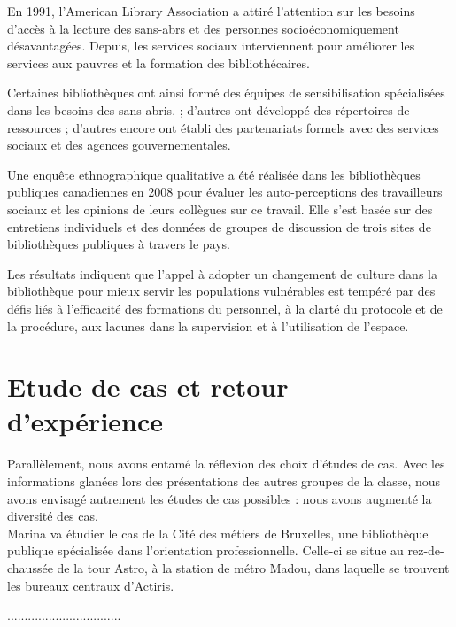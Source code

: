 \documentclass[french,a4paper,12pt]{article}
\begin{document}
\quad En 1991, l’American Library Association a attiré l’attention sur les besoins d’accès à la lecture des sans-abrs et des personnes socioéconomiquement désavantagées. Depuis, les services sociaux interviennent pour améliorer les services aux pauvres et la formation des bibliothécaires.  

Certaines bibliothèques ont ainsi formé des équipes de sensibilisation spécialisées dans les besoins des sans-abris. ; d'autres ont développé des répertoires de ressources ; d'autres encore ont établi des partenariats formels avec des services sociaux et des agences gouvernementales. 
 
Une enquête ethnographique qualitative a été réalisée dans les bibliothèques publiques canadiennes en 2008 pour évaluer les auto-perceptions des travailleurs sociaux et les opinions de leurs collègues sur ce travail. Elle s’est basée sur des entretiens individuels et des données de groupes de discussion de trois sites de bibliothèques publiques à travers le pays. 

Les résultats indiquent que l'appel à adopter un changement de culture dans la bibliothèque pour mieux servir les populations vulnérables est tempéré par des défis liés à l'efficacité des formations du personnel, à la clarté du protocole et de la procédure, aux lacunes dans la supervision et à l'utilisation de l'espace. 

 

 


\newpage
\section{Etude de cas et retour d'expérience}
\quad Parallèlement, nous avons entamé la réflexion des choix d’études de cas. Avec les informations glanées lors des présentations des autres groupes de la classe, nous avons envisagé autrement les études de cas possibles : nous avons augmenté la diversité des cas.\\ 

Marina va étudier le cas de la Cité des métiers de Bruxelles, une bibliothèque publique spécialisée dans l’orientation professionnelle. Celle-ci se situe au rez-de-chaussée de la tour Astro, à la station de métro Madou, dans laquelle se trouvent les bureaux centraux d’Actiris.

.................................\\
\end{document}
